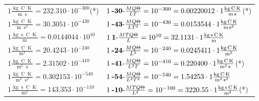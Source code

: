 \begin{center}
\begin{longtable}{l l}
{\color{black}$1 \bm{\mathrm{ }}\frac{\operatorname{kg}\operatorname{C}\operatorname{K}}{\operatorname{m}\operatorname{s}} = 232.310\cdot10^{-300} $}\quad(*)&
	{\color{black}$1\:\text{\textbf{-30}-} \frac{MQ\Theta}{LT}=10^{-300} = 0.00220012 \cdot 1 \bm{\mathrm{ }}\frac{\operatorname{kg}\operatorname{C}\operatorname{K}}{\operatorname{m}\operatorname{s}}$}\quad(*)\\
{\color{black}$1 \bm{\mathrm{ }}\frac{\operatorname{kg}\operatorname{C}\operatorname{K}}{\operatorname{m}\operatorname{s}^2} = 30.3051\cdot10^{-430} $}&
	{\color{black}$1\:\text{\textbf{-43}-} \frac{MQ\Theta}{LT^2}=10^{-430} = 0.0153544 \cdot 1 \bm{\mathrm{ }}\frac{\operatorname{kg}\operatorname{C}\operatorname{K}}{\operatorname{m}\operatorname{s}^2}$}\\
{\color{black}$1 \bm{\mathrm{ }}\frac{\operatorname{kg}\operatorname{s}\operatorname{C}\operatorname{K}}{\operatorname{m}} = 0.0144044\cdot10^{10} $}&
	{\color{black}$1\:\text{\textbf{1}-} \frac{MTQ\Theta}{L}=10^{10} = 32.1131 \cdot 1 \bm{\mathrm{ }}\frac{\operatorname{kg}\operatorname{s}\operatorname{C}\operatorname{K}}{\operatorname{m}}$}\\
{\color{black}$1 \bm{\mathrm{ }}\frac{\operatorname{kg}\operatorname{C}\operatorname{K}}{\operatorname{m}^2} = 20.4243\cdot10^{-240} $}&
	{\color{black}$1\:\text{\textbf{-24}-} \frac{MQ\Theta}{L^2}=10^{-240} = 0.0245411 \cdot 1 \bm{\mathrm{ }}\frac{\operatorname{kg}\operatorname{C}\operatorname{K}}{\operatorname{m}^2}$}\\
{\color{black}$1 \bm{\mathrm{ }}\frac{\operatorname{kg}\operatorname{C}\operatorname{K}}{\operatorname{m}^2\operatorname{s}} = 2.31502\cdot10^{-410} $}&
	{\color{black}$1\:\text{\textbf{-41}-} \frac{MQ\Theta}{L^2T}=10^{-410} = 0.220400 \cdot 1 \bm{\mathrm{ }}\frac{\operatorname{kg}\operatorname{C}\operatorname{K}}{\operatorname{m}^2\operatorname{s}}$}\quad(*)\\
{\color{black}$1 \bm{\mathrm{ }}\frac{\operatorname{kg}\operatorname{C}\operatorname{K}}{\operatorname{m}^2\operatorname{s}^2} = 0.302153\cdot10^{-540} $}&
	{\color{black}$1\:\text{\textbf{-54}-} \frac{MQ\Theta}{L^2T^2}=10^{-540} = 1.54253 \cdot 1 \bm{\mathrm{ }}\frac{\operatorname{kg}\operatorname{C}\operatorname{K}}{\operatorname{m}^2\operatorname{s}^2}$}\\
{\color{black}$1 \bm{\mathrm{ }}\frac{\operatorname{kg}\operatorname{s}\operatorname{C}\operatorname{K}}{\operatorname{m}^2} = 143.353\cdot10^{-110} $}&
	{\color{black}$1\:\text{\textbf{-10}-} \frac{MTQ\Theta}{L^2}=10^{-100} = 3220.55 \cdot 1 \bm{\mathrm{ }}\frac{\operatorname{kg}\operatorname{s}\operatorname{C}\operatorname{K}}{\operatorname{m}^2}$}\quad(*)\\

\end{longtable}
\end{center}

